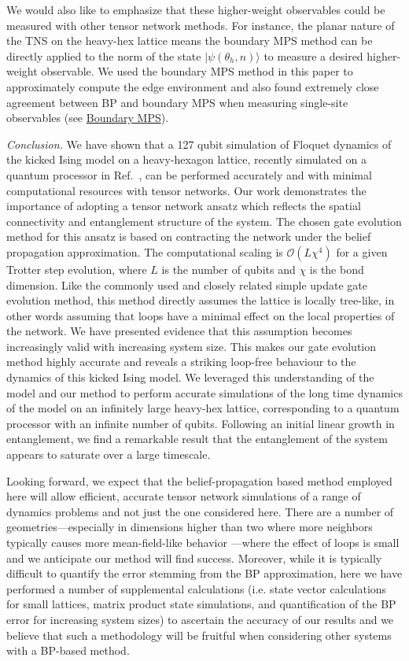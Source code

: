 \documentclass[%
 superscriptaddress,
 amsmath,amssymb,
 prx, nofootinbib,
 twocolumn
]{revtex4-2}
\begin{document}
We would also like to emphasize that these higher-weight observables could be measured with other tensor network methods. For instance, the planar nature of the TNS on the heavy-hex lattice means the boundary MPS \cite{Verstraete2004} method can be directly applied to the norm of the state $|\psi(\theta_h,n) \rangle$ to measure a desired higher-weight observable. We used the boundary MPS method in this paper to approximately compute the edge environment and also found extremely close agreement between BP and boundary MPS when measuring single-site observables (see \hyperref[Subsec:BoundaryMPS]{Boundary MPS}).

\emph{Conclusion.} 
We have shown that a 127 qubit simulation of Floquet dynamics of the kicked Ising model on a heavy-hexagon lattice, recently simulated on a quantum processor in Ref.~\cite{kim2023}, can be performed accurately and with minimal computational resources with tensor networks. Our work  demonstrates the importance of adopting a tensor network ansatz which  reflects the spatial connectivity and entanglement structure of the system. The chosen gate evolution method for this ansatz is based on contracting the network under the belief propagation approximation. The computational scaling is $\mathcal{O}(L \chi^{4})$ for a given Trotter step evolution, where $L$ is the number of qubits and $\chi$ is the bond dimension. 
Like the commonly used and closely related simple update gate evolution method, this method directly assumes the lattice is locally tree-like, in other words assuming that loops have a minimal effect on the local properties of the network. We have presented evidence that this assumption becomes increasingly valid with increasing system size. This makes our gate evolution method highly accurate and reveals a striking loop-free behaviour to the dynamics of this kicked Ising model. We leveraged this understanding of the model and our method to perform accurate simulations of the long time dynamics of the model on an infinitely large heavy-hex lattice, corresponding to a quantum processor with an infinite number of qubits. Following an initial linear growth in entanglement, we find a remarkable result that the entanglement of the system appears to saturate over a large timescale. 
\par Looking forward, we expect that the belief-propagation based method employed here will allow efficient, accurate tensor network simulations of a range of dynamics problems and not just the one considered here. There are a number of geometries---especially in dimensions higher than two where more neighbors typically causes more mean-field-like behavior \cite{Vlaar2021}---where the effect of loops is small and we anticipate our method will find success. Moreover, while it is typically difficult to quantify the error stemming from the BP approximation, here we have performed a number of supplemental calculations (i.e. state vector calculations for small lattices, matrix product state simulations, and quantification of the BP error for increasing system sizes) to ascertain the accuracy of our results and we believe that such a methodology will be fruitful when considering other systems with a BP-based method. 
\end{document}
